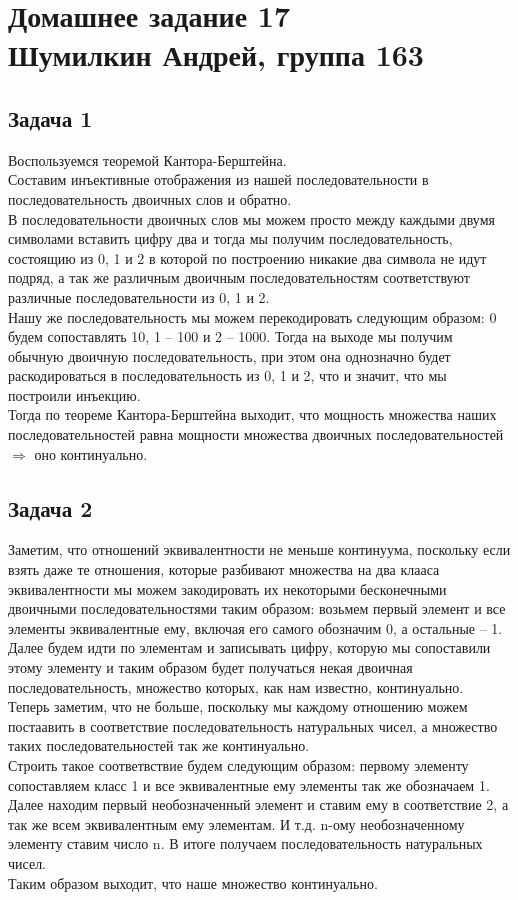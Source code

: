 

	\section{Домашнее задание 17\\ Шумилкин Андрей, группа 163} 
	\subsection{Задача 1}
	Воспользуемся теоремой Кантора-Берштейна. \\
	Составим инъективные отображения из нашей последовательности в последовательность двоичных слов и обратно. \\
	В последовательности двоичных слов мы можем просто между каждыми двумя символами вставить цифру два и тогда мы получим последовательность, состоящию из 0, 1 и 2 в которой по построению никакие два символа не идут подряд, а так же различным двоичным последовательностям соответствуют различные последовательности из 0, 1 и 2. \\
	Нашу же последовательность мы можем перекодировать следующим образом: 0 будем сопоставлять 10, 1 -- 100 и 2 -- 1000. Тогда на выходе мы получим обычную двоичную последовательность, при этом она однозначно будет раскодироваться в последовательность из 0, 1 и 2, что и значит, что мы построили инъекцию. \\
	Тогда по теореме Кантора-Берштейна выходит, что мощность множества наших последовательностей равна мощности множества двоичных последовательностей $\Rightarrow$ оно континуально.
	
	\subsection{Задача 2}
	Заметим, что отношений эквивалентности не меньше континуума, поскольку если взять даже те отношения, которые разбивают множества на два клааса эквивалентности мы можем закодировать их некоторыми бесконечными двоичными последовательностями таким образом: возьмем первый элемент и все элементы эквивалентные ему, включая его самого обозначим 0, а остальные -- 1.\\
	Далее будем идти по элементам и записывать цифру, которую мы сопоставили этому элементу и таким образом будет получаться некая двоичная последовательность, множество которых, как нам известно, континуально. \\
	Теперь заметим, что не больше, поскольку мы каждому отношению можем постаавить в соответствие последовательность натуральных чисел, а множество таких последовательностей так же континуально. \\
	Строить такое соответвствие будем следующим образом: первому элементу сопоставляем класс 1 и все эквивалентные ему элементы так же обозначаем 1. Далее находим первый необозначенный элемент и ставим ему в соответствие 2, а так же всем эквивалентным ему элементам. И т.д. n-ому необозначенному элементу ставим число n. В итоге получаем последовательность натуральных чисел. \\
	Таким образом выходит, что наше множество континуально. 
	

